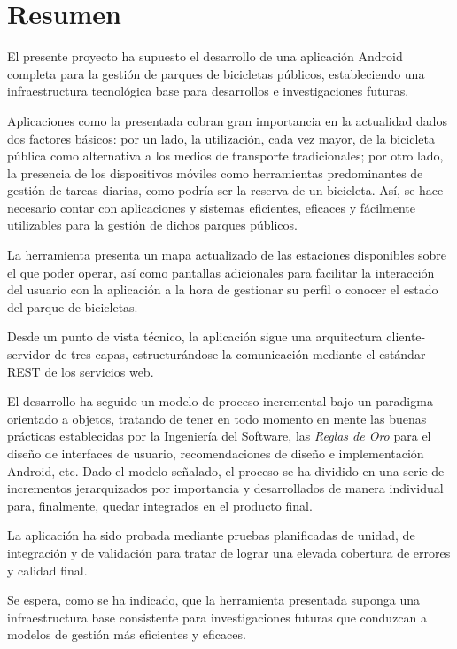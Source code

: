
\chapter{Resumen}


El presente proyecto ha supuesto el desarrollo de una aplicación Android completa para la gestión de parques de bicicletas públicos, estableciendo una infraestructura tecnológica base para desarrollos e investigaciones futuras. 

Aplicaciones como la presentada cobran gran importancia en la actualidad dados dos factores básicos: por un lado, la utilización, cada vez mayor, de la bicicleta pública como alternativa a los medios de transporte tradicionales; por otro lado, la presencia de los dispositivos móviles como herramientas predominantes de gestión de tareas diarias, como podría ser la reserva de un bicicleta. Así, se hace necesario contar con aplicaciones y sistemas eficientes, eficaces y fácilmente utilizables para la gestión de dichos parques públicos.

La herramienta presenta un mapa actualizado de las estaciones disponibles sobre el que poder operar, así como pantallas adicionales para facilitar la interacción del usuario con la aplicación a la hora de gestionar su perfil o conocer el estado del parque de bicicletas.

Desde un punto de vista técnico, la aplicación sigue una arquitectura cliente-servidor de tres capas, estructurándose la comunicación mediante el estándar REST de los servicios web. 

El desarrollo ha seguido un modelo de proceso incremental bajo un paradigma orientado a objetos, tratando de tener en todo momento en mente las buenas prácticas establecidas por la Ingeniería del Software, las \emph{Reglas de Oro} para el diseño de interfaces de usuario, recomendaciones de diseño e implementación Android, etc. Dado el modelo señalado, el proceso se ha dividido en una serie de incrementos jerarquizados por importancia y desarrollados de manera individual para, finalmente, quedar integrados en el producto final.

La aplicación ha sido probada mediante pruebas planificadas de unidad, de integración y de validación para tratar de lograr una elevada cobertura de errores y calidad final.

Se espera, como se ha indicado, que la herramienta presentada suponga una infraestructura base consistente para investigaciones futuras que conduzcan a modelos de gestión más eficientes y eficaces.




